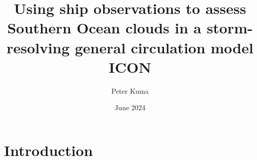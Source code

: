 \documentclass{article}
\title{Using ship observations to assess Southern Ocean clouds in a storm-resolving general circulation model ICON}
\author{Peter Kuma}
\date{June 2024}
\begin{document}
\maketitle

\section{Introduction}
\end{document}
